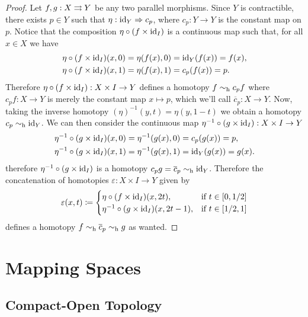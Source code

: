 \begin{proof}
    Let \(f, g: X \rightrightarrows Y\) be any two parallel morphisms. Since \(Y\) is
    contractible, there exists \(p \in Y\) such that \(\eta: \operatorname{id}_Y \Rightarrow c_p\), where
    \(c_p: Y \to Y\) is the constant map on \(p\). Notice that the composition
    \(\eta \circ (f \times \operatorname{id}_I)\) is a continuous map such that, for all
    \(x \in X\) we have
    \begin{align*}
        \eta \circ (f \times \operatorname{id}_I)(x, 0) & = \eta(f(x), 0) = \operatorname{id}_Y(f(x)) = f(x), \\
        \eta \circ (f \times \operatorname{id}_I)(x, 1) & = \eta(f(x), 1) = c_p(f(x)) = p.
    \end{align*}
    Therefore \(\eta \circ (f \times \operatorname{id}_I): X \times I \to Y\) defines a homotopy
    \(f \sim_{\text{h}} c_p f\) where \(c_p f: X \to Y\) is merely the constant map
    \(x \mapsto p\), which we'll call \(\overline{c}_p: X \to Y\). Now, taking the
    inverse homotopy \((\eta)^{-1}(y, t) = \eta(y, 1 - t)\) we obtain a homotopy
    \(c_p \sim_{\text{h}} \operatorname{id}_Y\). We can then consider the continuous map
    \(\eta^{-1} \circ (g \times \operatorname{id}_I): X \times I \to Y\)
    \begin{align*}
        \eta^{-1} \circ (g \times \operatorname{id}_I)(x, 0) & = \eta^{-1}(g(x), 0) = c_p(g(x)) = p,      \\
        \eta^{-1} \circ (g \times \operatorname{id}_I)(x, 1) & = \eta^{-1}(g(x), 1) = \operatorname{id}_Y(g(x)) = g(x).
    \end{align*}
    therefore \(\eta^{-1} \circ (g \times \operatorname{id}_I)\) is a homotopy \(c_p g =
    \overline{c}_p \sim_{\text{h}} \operatorname{id}_Y\). Therefore the concatenation of homotopies
    \(\varepsilon: X \times I \to Y\) given by
    \[
        \varepsilon(x, t) \coloneq
        \begin{cases}
            \eta \circ (f \times \operatorname{id}_I)(x, 2 t),          & \text{if } t \in [0, 1/2] \\
            \eta^{-1} \circ (g \times \operatorname{id}_I)(x, 2 t - 1), & \text{if } t \in [1/2, 1]
        \end{cases}
    \]
    defines a homotopy \(f \sim_{\text{h}} \overline{c}_p \sim_{\text{h}} g\) as wanted.
\end{proof}

\section{Mapping Spaces}

\subsection{Compact-Open Topology}

